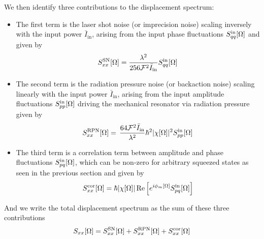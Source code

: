 We then identify three contributions to the displacement spectrum:
\begin{itemize}
  \item The first term is the laser shot noise (or imprecision noise) scaling inversely with the input power $\bar{I}_\mathrm{in}$, arising from the input phase fluctuations $S_{qq}^{\rm in}[\Omega]$ and given by
  \begin{equation}
    S_{xx}^{\rm SN}[\Omega] = \dfrac{\lambda^2}{256 \mathcal{F}^2 \bar{I}_\mathrm{in}} S_{qq}^{\rm in}[\Omega]
  \end{equation}
  \item The second term is the radiation pressure noise (or backaction noise) scaling linearly with the input power $\bar{I}_\mathrm{in}$, arising from the input amplitude fluctuations $S_{pp}^{\rm in}[\Omega]$ driving the mechanical resonator via radiation pressure given by 
  \begin{equation}
    S_{xx}^{\rm RPN}[\Omega] = \, \dfrac{64 \mathcal{F}^2 \bar{I}_\mathrm{in}}{\lambda^2}\hbar^2 |\chi[\Omega]|^2 S_{pp}^{\rm in}[\Omega]
  \end{equation}
  \item The third term is a correlation term between amplitude and phase fluctuations $S_{pq}^{\rm in}[\Omega]$, which can be non-zero for arbitrary squeezed states as seen in the previous section and given by
  \begin{equation}
    S_{xx}^{\rm cor}[\Omega] = \hbar |\chi[\Omega]|\Re\Big[ e^{i\phi_m[\Omega]} S_{pq}^{\rm in}[\Omega]\Big]
  \end{equation}
\end{itemize}
And we write the total displacement spectrum as the sum of these three contributions
\begin{equation}
  S_{xx}[\Omega] = S_{xx}^{\rm SN}[\Omega] + S_{xx}^{\rm RPN}[\Omega] + S_{xx}^{\rm cor}[\Omega]
\end{equation}

